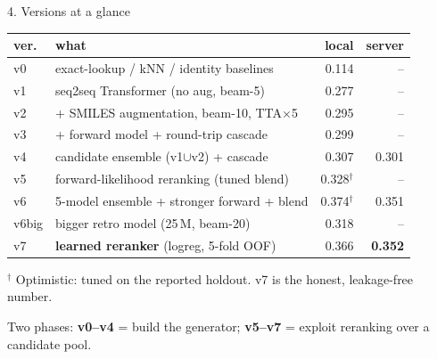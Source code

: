 \documentclass[aspectratio=169,11pt]{beamer}
\begin{document}
\begin{frame}{4. Versions at a glance}
  \small
  \begin{tabular}{lp{6.2cm}rr}
    \toprule
    \textbf{ver.} & \textbf{what} & \textbf{local} & \textbf{server} \\
    \midrule
    v0 & exact-lookup / kNN / identity baselines     & 0.114 & --    \\
    v1 & seq2seq Transformer (no aug, beam-5)         & 0.277 & --    \\
    v2 & + SMILES augmentation, beam-10, TTA$\times$5 & 0.295 & --    \\
    v3 & + forward model + round-trip cascade         & 0.299 & --    \\
    v4 & candidate ensemble (v1$\cup$v2) + cascade    & 0.307 & 0.301 \\
    \midrule
    v5 & forward-likelihood reranking (tuned blend)   & 0.328$^\dagger$ & --    \\
    v6 & 5-model ensemble + stronger forward + blend  & 0.374$^\dagger$ & 0.351 \\
    v6big & bigger retro model (25\,M, beam-20)       & 0.318 & --    \\
    v7 & \textbf{learned reranker} (logreg, 5-fold OOF) & 0.366 & \textbf{0.352} \\
    \bottomrule
  \end{tabular}

  \vspace{0.5em}
  $^\dagger$ Optimistic: tuned on the reported holdout. v7 is the honest,
  leakage-free number.

  \vspace{0.3em}
  Two phases: \textbf{v0--v4} = build the generator; \textbf{v5--v7} = exploit
  reranking over a candidate pool.
\end{frame}
\end{document}
